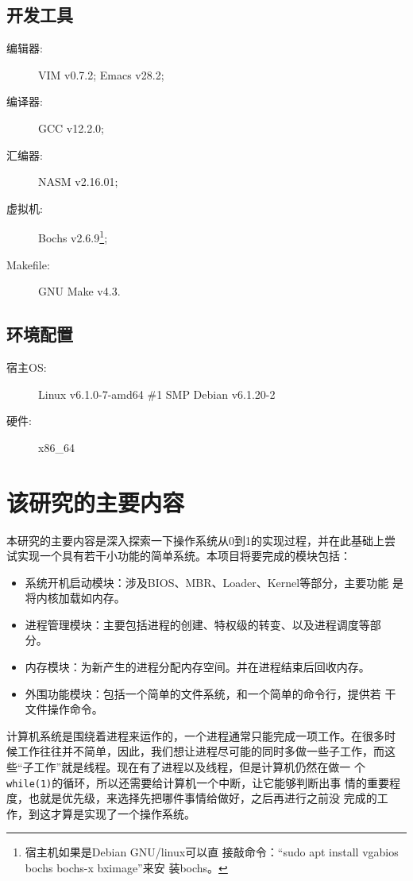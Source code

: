 \subsection{开发工具}

\begin{description}
\item[编辑器:] VIM v0.7.2; Emacs v28.2;
\item[编译器:] GCC v12.2.0;
\item[汇编器:] NASM v2.16.01;
\item[虚拟机:] Bochs v2.6.9\footnote{宿主机如果是Debian GNU/linux可以直
    接敲命令：“sudo apt install vgabios bochs bochs-x bximage”来安
    装bochs。};
\item[Makefile:] GNU Make v4.3.
\end{description}

\subsection{环境配置}

\begin{description}
\item[宿主OS:] Linux v6.1.0-7-amd64 \#1 SMP Debian v6.1.20-2
\item[硬件:] x86\_64
\end{description}

\section{该研究的主要内容}

本研究的主要内容是深入探索一下操作系统从0到1的实现过程，并在此基础上尝
试实现一个具有若干小功能的简单系统。本项目将要完成的模块包括：
\begin{itemize}
\item 系统开机启动模块：涉及BIOS、MBR、Loader、Kernel等部分，主要功能
  是将内核加载如内存。
\item 进程管理模块：主要包括进程的创建、特权级的转变、以及进程调度等部
  分。
\item 内存模块：为新产生的进程分配内存空间。并在进程结束后回收内存。
\item 外围功能模块：包括一个简单的文件系统，和一个简单的命令行，提供若
  干文件操作命令。
\end{itemize}

计算机系统是围绕着进程来运作的，一个进程通常只能完成一项工作。在很多时
候工作往往并不简单，因此，我们想让进程尽可能的同时多做一些子工作，而这
些“子工作”就是线程。现在有了进程以及线程，但是计算机仍然在做一
个\texttt{while(1)}的循环，所以还需要给计算机一个中断，让它能够判断出事
情的重要程度，也就是优先级，来选择先把哪件事情给做好，之后再进行之前没
完成的工作，到这才算是实现了一个操作系统\cite{yy2009}。


